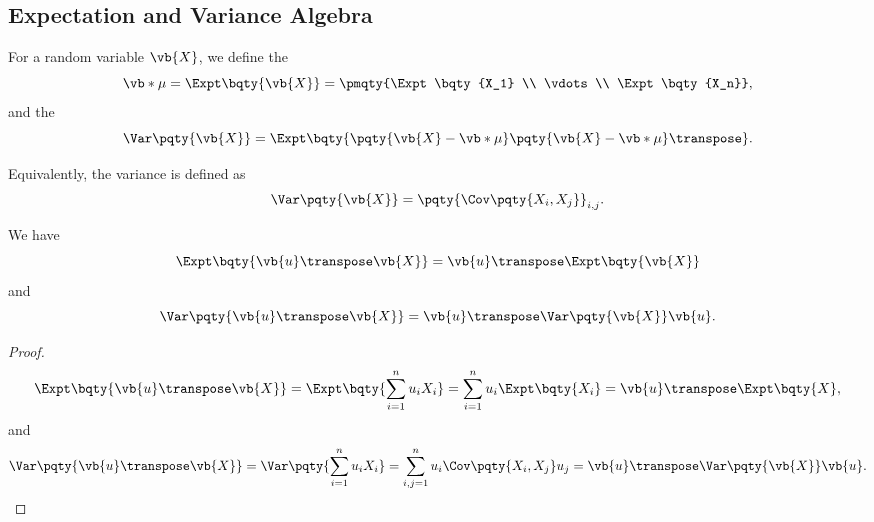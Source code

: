 \subsection{Expectation and Variance Algebra}

\begin{definition}
    \label{def:expt-var-multivariate}%
    For a random variable \(\vb{X}\), we define the 
    \[
        \vb*{\mu} = \Expt\bqty{\vb{X}} = \pmqty{\Expt\bqty{X_1} \\ \vdots \\ \Expt\bqty{X_n}},
    \]
    and the 
    \[
        \Var\pqty{\vb{X}} = \Expt\bqty{\pqty{\vb{X} - \vb*{\mu}} \pqty{\vb{X} - \vb*{\mu}}\transpose}.
    \]

    Equivalently, the variance is defined as
    \[
        \Var\pqty{\vb{X}} = \pqty{\Cov\pqty{X_i, X_j}}_{i, j}.
    \]
\end{definition}

\begin{proposition}
    \label{prop:expt-var-transform-multivariate-rv}%
    We have
    \[
        \Expt\bqty{\vb{u} \transpose \vb{X}} = \vb{u}\transpose \Expt\bqty{\vb{X}}
    \]
    and
    \[
        \Var\pqty{\vb{u} \transpose \vb{X}} = \vb{u}\transpose \Var\pqty{\vb{X}} \vb{u}.
    \]
\end{proposition}

\begin{proof}
    \[
        \Expt\bqty{\vb{u} \transpose \vb{X}} = \Expt\bqty{\sum_{i = 1}^{n} u_i X_i} = \sum_{i = 1}^{n} u_i \Expt\bqty{X_i} = \vb{u}\transpose \Expt\bqty{X},
    \]
    and
    \[
        \Var\pqty{\vb{u} \transpose \vb{X}} = \Var\pqty{\sum_{i = 1}^{n} u_i X_i} = \sum_{i, j = 1}^{n} u_i \Cov\pqty{X_i, X_j} u_j = \vb{u}\transpose \Var\pqty{\vb{X}} \vb{u}.
    \]
\end{proof}

